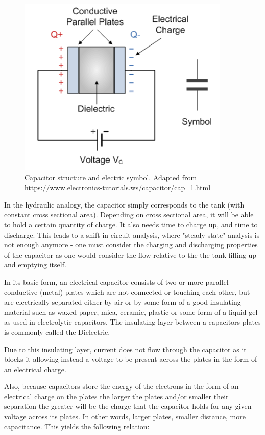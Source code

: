 \begin{figure}[H]
    \centering
    \includegraphics[width=0.55\linewidth]{../../Figures/Capacitors.PNG}
    \caption{Capacitor structure and electric symbol. Adapted from https://www.electronics-tutorials.ws/capacitor/cap_1.html}
    \label{fig:Capacitors}
\end{figure}

In the hydraulic analogy, the capacitor simply corresponds to the tank (with constant cross sectional area). Depending on cross sectional area, it will be able to hold a certain quantity of charge. It also needs time to charge up, and time to discharge. This leads to a shift in circuit analysis, where "steady state" analysis is not enough anymore - one must consider the charging and discharging properties of the capacitor as one would consider the flow relative to the the tank filling up and emptying itself. 

In its basic form, an electrical capacitor consists of two or more parallel conductive (metal) plates which are not connected or touching each other, but are electrically separated either by air or by some form of a good insulating material such as waxed paper, mica, ceramic, plastic or some form of a liquid gel as used in electrolytic capacitors. The insulating layer between a capacitors plates is commonly called the Dielectric.

Due to this insulating layer, current does not flow through the capacitor as it blocks it allowing instead a voltage to be present across the plates in the form of an electrical charge.

Also, because capacitors store the energy of the electrons in the form of an electrical charge on the plates the larger the plates and/or smaller their separation the greater will be the charge that the capacitor holds for any given voltage across its plates. In other words, larger plates, smaller distance, more capacitance. This yields the following relation:

